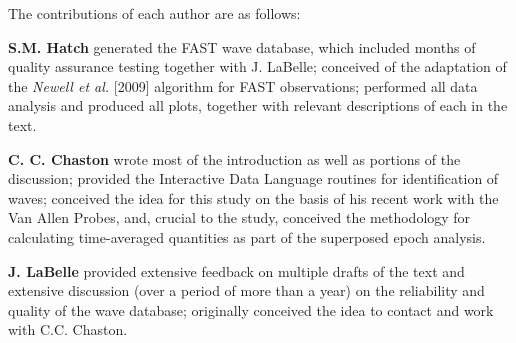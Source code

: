 The contributions of each author are as follows:

\textbf{S.M. Hatch} generated the FAST \Alf wave database, which
included months of quality assurance testing together with J. LaBelle;
conceived of the adaptation of the \textsl{Newell et al.} [2009]
algorithm for FAST observations; performed all data analysis and
produced all plots, together with relevant descriptions of each in the
text.

\textbf{C. C. Chaston} wrote most of the introduction as well as
portions of the discussion; provided the Interactive Data Language
routines for identification of \Alf waves; conceived the idea for this
study on the basis of his recent work with the Van Allen Probes, and,
crucial to the study, conceived the methodology for calculating
time-averaged quantities as part of the superposed epoch analysis.

\textbf{J. LaBelle} provided extensive feedback on multiple drafts of
the text and extensive discussion (over a period of more than a year)
on the reliability and quality of the \Alf wave database; originally
conceived the idea to contact and work with C.C. Chaston.




\restoregeometry
    
